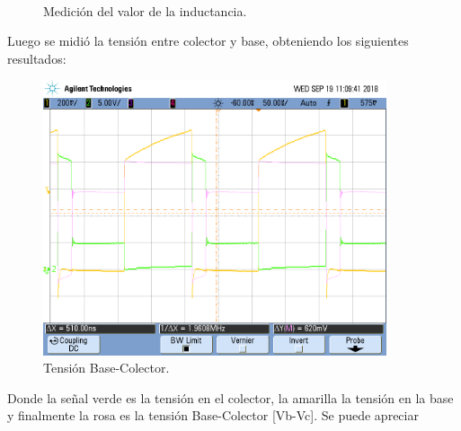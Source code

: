 \begin{figure}[H]
\\
\caption{Medición del valor de la inductancia.}
\label{fig:medL}
\end{figure}
Luego se midió la tensión entre colector y base, obteniendo los siguientes resultados:
\begin{figure}[H]
	\centering
	\includegraphics[width=0.9\textwidth]{Imagenes/vbc_vc_ab.png}
\caption{Tensión Base-Colector.}
	\label{fig:vbc}
\end{figure}
Donde la señal verde es la tensión en el colector, la amarilla la tensión en la base y finalmente la rosa es la tensión Base-Colector [Vb-Vc].
Se puede apreciar


